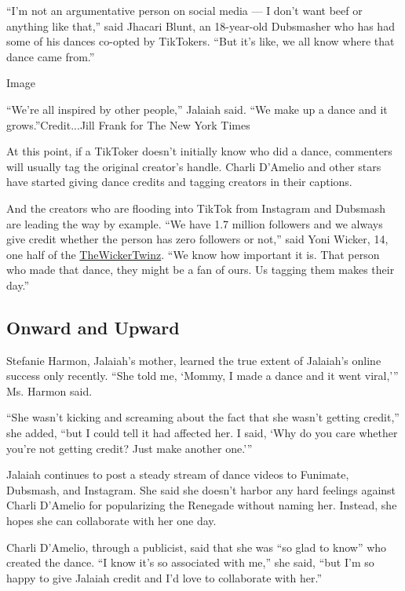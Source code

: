 ``I'm not an argumentative person on social media --- I don't want beef
or anything like that,'' said Jhacari Blunt, an 18-year-old Dubsmasher
who has had some of his dances co-opted by TikTokers. ``But it's like,
we all know where that dance came from.''

Image

``We're all inspired by other people,'' Jalaiah said. ``We make up a
dance and it grows.''Credit...Jill Frank for The New York Times

At this point, if a TikToker doesn't initially know who did a dance,
commenters will usually tag the original creator's handle. Charli
D'Amelio and other stars have started giving dance credits and tagging
creators in their captions.

And the creators who are flooding into TikTok from Instagram and
Dubsmash are leading the way by example. ``We have 1.7 million followers
and we always give credit whether the person has zero followers or
not,'' said Yoni Wicker, 14, one half of the
\href{https://www.instagram.com/thewickertwinz/?hl=en}{TheWickerTwinz}.
``We know how important it is. That person who made that dance, they
might be a fan of ours. Us tagging them makes their day.''

\hypertarget{onward-and-upward}{%
\subsection{Onward and Upward}\label{onward-and-upward}}

Stefanie Harmon, Jalaiah's mother, learned the true extent of Jalaiah's
online success only recently. ``She told me, `Mommy, I made a dance and
it went viral,''' Ms. Harmon said.

``She wasn't kicking and screaming about the fact that she wasn't
getting credit,'' she added, ``but I could tell it had affected her. I
said, `Why do you care whether you're not getting credit? Just make
another one.'''

Jalaiah continues to post a steady stream of dance videos to Funimate,
Dubsmash, and Instagram. She said she doesn't harbor any hard feelings
against Charli D'Amelio for popularizing the Renegade without naming
her. Instead, she hopes she can collaborate with her one day.

Charli D'Amelio, through a publicist, said that she was ``so glad to
know'' who created the dance. ``I know it's so associated with me,'' she
said, ``but I'm so happy to give Jalaiah credit and I'd love to
collaborate with her.''

